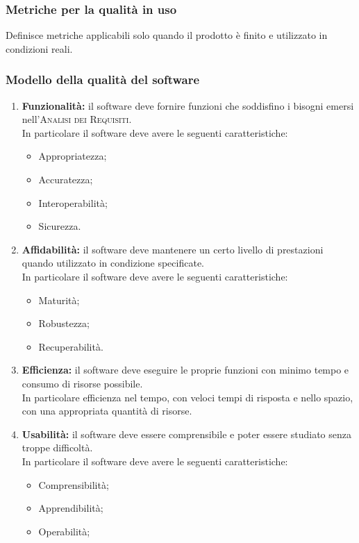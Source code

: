 \subsubsection{Metriche per la qualità in uso}
Definisce metriche applicabili solo quando il prodotto è finito e utilizzato in condizioni reali.
\subsubsection{Modello della qualità del software}
\begin{enumerate}
	\item \textbf{Funzionalità:} il software deve fornire funzioni che soddisfino i bisogni emersi nell'\textsc{Analisi dei Requisiti}.\\In particolare il software deve avere le seguenti caratteristiche:
		\begin{itemize}
			\item Appropriatezza;
			\item Accuratezza;
			\item Interoperabilità;
			\item Sicurezza.
		\end{itemize} 
	\item \textbf{Affidabilità:} il software deve mantenere un certo livello di prestazioni quando utilizzato in condizione specificate.\\In particolare il software deve avere le seguenti caratteristiche:
		\begin{itemize}
			\item Maturità;
			\item Robustezza;
			\item Recuperabilità.
		\end{itemize}
	\item \textbf{Efficienza:} il software deve eseguire le proprie funzioni con minimo tempo e consumo di risorse possibile.\\In particolare efficienza nel tempo, con veloci tempi di risposta e nello spazio, con una appropriata quantità di risorse.
	\item \textbf{Usabilità:} il software deve essere comprensibile e poter essere studiato senza troppe difficoltà.\\In particolare il software deve avere le seguenti caratteristiche:
		\begin{itemize}
			\item Comprensibilità;
			\item Apprendibilità;
			\item Operabilità;

\end{itemize}
\end{enumerate}
